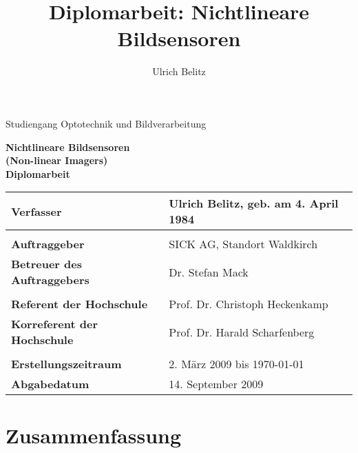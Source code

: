\documentclass[12pt,a4paper,titlepage]{article} %
\title{Diplomarbeit: Nichtlineare Bildsensoren}
\author{Ulrich Belitz}
\begin{document}
\begin{titlepage}
\hspace{35mm} %
\begin{flushright}
	\scriptsize
	Studiengang Optotechnik und Bildverarbeitung\\[4cm]
\end{flushright}
\begin{center}
	
	\textbf{\Huge{Nichtlineare Bildsensoren}}\\[4mm]%
	\textbf{\large{(Non-linear Imagers)}}\\[10mm]
	\textbf{\Large{Diplomarbeit \\[38mm]}} %

	\begin{tabular}{ll}
		\textbf{Verfasser} & Ulrich Belitz, geb. am 4. April 1984\\[3mm]
		\hline
		& \\
		\textbf{Auftraggeber} & SICK AG, Standort Waldkirch\\[2mm]
		\textbf{Betreuer des Auftraggebers} & Dr. Stefan Mack\\[3mm]
		\hline
		& \\
		\textbf{Referent der Hochschule} & Prof. Dr. Christoph Heckenkamp\\[2mm]
		\textbf{Korreferent der Hochschule} & Prof. Dr. Harald Scharfenberg\\[3mm]
		\hline
		& \\
		\textbf{Erstellungszeitraum} & 2. März 2009 bis \today \\[2mm] %
		\textbf{Abgabedatum} & 14. September 2009
	\end{tabular}
\end{center}
\end{titlepage}

\clearpage
\newpage


\section*{Zusammenfassung}
\end{document}
